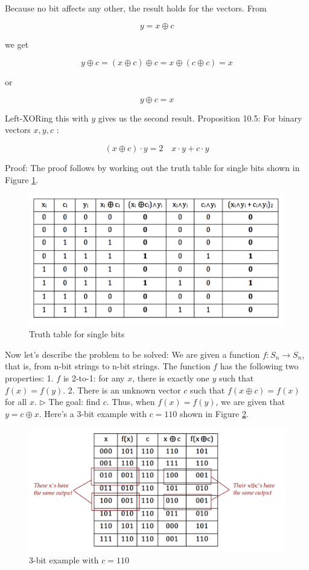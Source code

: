 \documentclass[main.tex]{subfiles}
\begin{document}
    Because no bit affects any other, the result holds for the vectors. From
    
    $$
    y=x \oplus c
    $$
    
    we get
    
    $$
    y \oplus c=(x \oplus c) \oplus c=x \oplus(c \oplus c)=x
    $$
    
    or
    
    $$
    y \oplus c=x
    $$
    
    Left-XORing this with $y$ gives us the second result. Proposition 10.5: For binary vectors $x, y, c$ :
    
    $$
    (x \oplus c) \cdot y=2 \quad x \cdot y+c \cdot y
    $$
    
    Proof: The proof follows by working out the truth table for single bits shown in Figure \ref{fig:21simon1b}.
    
    \begin{figure}
        \centering
        \includegraphics[width=5in]{notes/figs/n11/21simon1b.png}
            \caption{Truth table for single bits}
        \label{fig:21simon1b}
    \end{figure}
    
    Now let's describe the problem to be solved: We are given a function $f: S_{n} \rightarrow S_{n}$, that is, from n-bit strings to $\mathrm{n}$-bit strings. The function $f$ has the following two properties: 1. $f$ is 2-to-1: for any $x$, there is exactly one $y$ such that $f(x)=f(y)$. 2. There is an unknown vector $c$ such that $f(x \oplus c)=f(x)$ for all $x$. $\triangleright$ The goal: find $c$. Thus, when $f(x)=f(y)$, we are given that $y=c \oplus x$. Here's a 3-bit example with $c=110$ shown in Figure \ref{fig:22simon2}.
    
    \begin{figure}
        \centering
        \includegraphics[width=5in]{notes/figs/n11/22simon2.png}
            \caption{3-bit example with $c=110$}
        \label{fig:22simon2}
    \end{figure}
    
\end{document}
